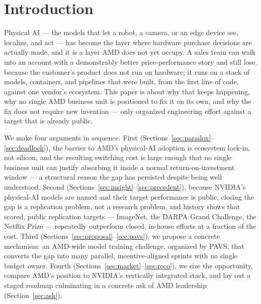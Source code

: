 \documentclass[blind]{gtac}
\begin{document}
\begin{abstract}
a customer-facing role for PAVS as the physical-AI gateway across AMD, a competitive analysis against NVIDIA's vertically integrated stack, and a staged roadmap. The central claim: AMD does not need new silicon to win these deals --- it needs the engineering cycles, already available across the organization, pointed at a known, bounded, and now organizationally unblocked target.
\end{abstract}


\section{Introduction}
\label{sec:intro}

Physical AI --- the models that let a robot, a camera, or an edge device see, localize, and act --- has become the layer where hardware purchase decisions are actually made, and it is a layer AMD does not yet occupy. A sales team can walk into an account with a demonstrably better price-performance story and still lose, because the customer's product does not run on hardware; it runs on a stack of models, containers, and pipelines that were built, from the first line of code, against one vendor's ecosystem. This paper is about why that keeps happening, why no single AMD business unit is positioned to fix it on its own, and why the fix does not require new invention --- only organized engineering effort against a target that is already public.

We make four arguments in sequence. First (Sections~\ref{sec:paradox}--\ref{sec:deadlock}), the barrier to AMD's physical-AI adoption is ecosystem lock-in, not silicon, and the resulting switching cost is large enough that no single business unit can justify absorbing it inside a normal return-on-investment window --- a structural reason the gap has persisted despite being well understood. Second (Sections~\ref{sec:insight}--\ref{sec:precedent}), because NVIDIA's physical-AI models are named and their target performance is public, closing the gap is a replication problem, not a research problem, and history shows that scored, public replication targets --- ImageNet, the DARPA Grand Challenge, the Netflix Prize --- repeatedly outperform closed, in-house efforts at a fraction of the cost. Third (Sections~\ref{sec:proposal}--\ref{sec:pavs}), we propose a concrete mechanism: an AMD-wide model training challenge, organized by PAVS, that converts the gap into many parallel, incentive-aligned sprints with no single budget owner. Fourth (Sections~\ref{sec:market}--\ref{sec:reco}), we size the opportunity, compare AMD's position to NVIDIA's vertically integrated stack, and lay out a staged roadmap culminating in a concrete ask of AMD leadership (Section~\ref{sec:ask}).
\end{document}
